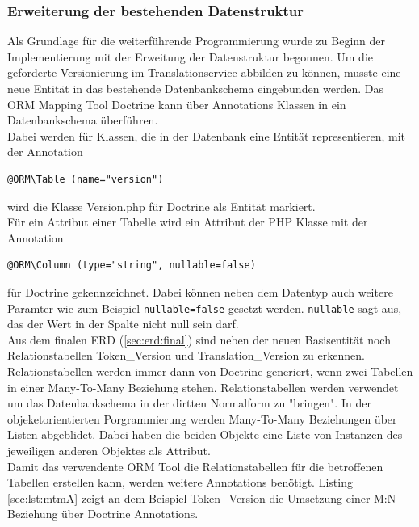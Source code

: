 \documentclass[10pt, oneside]{article}
\begin{document}
  \subsubsection{Erweiterung der bestehenden Datenstruktur}
    Als Grundlage für die weiterführende Programmierung wurde zu Beginn der Implementierung mit der Erweitung der Datenstruktur begonnen. 
    Um die geforderte Versionierung im Translationservice abbilden zu können, musste eine neue Entität in das bestehende Datenbankschema eingebunden werden.
    Das ORM Mapping Tool Doctrine kann über Annotations Klassen in ein Datenbankschema überführen.\\
    Dabei werden für Klassen, die in der Datenbank eine Entität representieren, mit der Annotation
    \begin{lstlisting}[caption={Annotation für eine Entität},captionpos=b]
      @ORM\Table (name="version")
    \end{lstlisting}
    wird die Klasse Version.php für Doctrine als Entität markiert.\\
    Für ein Attribut einer Tabelle wird ein Attribut der PHP Klasse mit der Annotation 
    \begin{lstlisting}[caption={Annotation für ein Attribut},captionpos=b]
      @ORM\Column (type="string", nullable=false)
    \end{lstlisting} 
    für Doctrine gekennzeichnet. Dabei können neben dem Datentyp auch weitere Paramter wie zum Beispiel \lstinline{nullable=false} gesetzt werden. \lstinline{nullable} sagt aus, das der Wert in der Spalte 
    nicht null sein darf.\\
    Aus dem finalen ERD (\ref{sec:erd:final}) sind neben der neuen Basisentität noch Relationstabellen Token\_Version und Translation\_Version zu erkennen. Relationstabellen werden immer dann von Doctrine generiert, wenn
    zwei Tabellen in einer Many-To-Many Beziehung stehen. Relationstabellen werden verwendet um das Datenbankschema in der dirtten Normalform zu "bringen". In der objeketorientierten Porgrammierung werden Many-To-Many Beziehungen über Listen abgeblidet. Dabei haben die beiden
    Objekte eine Liste von Instanzen des jeweiligen anderen Objektes als Attribut.\\
    Damit das verwendente ORM Tool die Relationstabellen für die betroffenen Tabellen erstellen kann, werden weitere Annotations benötigt. Listing \ref{sec:lst:mtmA} zeigt an dem Beispiel Token\_Version die Umsetzung einer M:N Beziehung über Doctrine Annotations.
\end{document}
